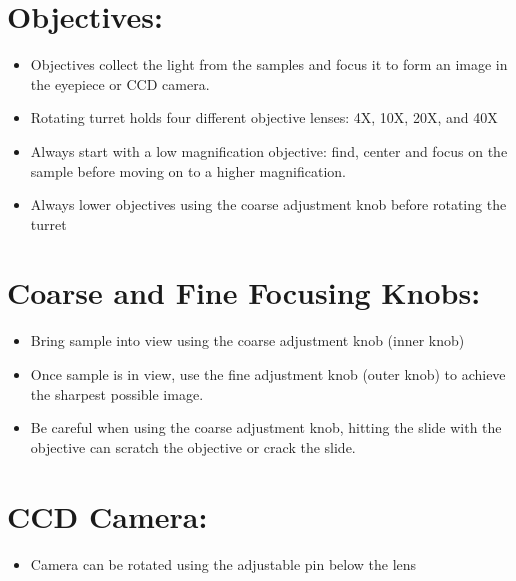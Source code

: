 \section*{Objectives:}
\begin{itemize}
	\setlength\itemsep{1pt}
	\item Objectives collect the light from the samples and focus it to form an image in the eyepiece or CCD camera.
	\item Rotating turret holds four different objective lenses: 4X, 10X, 20X, and 40X
	\item Always start with a low magnification objective: find, center and focus on the sample before moving on to a higher magnification.
	\item Always lower objectives using the coarse adjustment knob before rotating the turret
\end{itemize}

\section*{Coarse and Fine Focusing Knobs:}
\begin{itemize}
	\setlength\itemsep{1pt}
	\item Bring sample into view using the coarse adjustment knob (inner knob)
	\item Once sample is in view, use the fine adjustment knob (outer knob) to achieve the sharpest possible image.
	\item Be careful when using the coarse adjustment knob, hitting the slide with the objective can scratch the objective or crack the slide.
\end{itemize}

\section*{CCD Camera:}
\begin{itemize}
	\setlength\itemsep{1pt}	
	\item Camera can be rotated using the adjustable pin below the lens
\end{itemize}